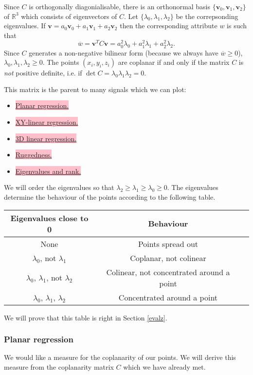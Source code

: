 \documentclass[a4paper,11pt,twoside]{article}
\theoremstyle{definition}
\theoremstyle{remark}
\newcommand{\sh}[1]{\colorbox{pink}{#1}}
\begin{document}
Since $C$ is orthogonally diagonialisable, there is an orthonormal basis $\{\mathbf{v}_0,\mathbf{v}_1,\mathbf{v}_2\}$ of $\mathbb{R}^3$ which consists of eigenvectors of $C$. Let $\{\lambda_0,\lambda_1,\lambda_2\}$ be the correpsonding eigenvalues. If $\mathbf{v}=a_0\mathbf{v}_0+a_1\mathbf{v}_1+a_2\mathbf{v}_2$ then the corresponding attribute $w$ is such that 
\begin{displaymath}
\overline w = \mathbf{v}^TC\mathbf{v}= a_0^2\lambda_0+a_1^2\lambda_1+a^2_2\lambda_2.
\end{displaymath}
Since $C$ generates a non-negative bilinear form (because we always have $\overline w\geqslant 0$), $\lambda_0,\lambda_1,\lambda_2\geqslant 0$. The points $(x_i,y_i,z_i)$ are coplanar if and only if the matrix $C$ is \emph{not} positive definite, i.e. if $\det C =\lambda_0\lambda_1\lambda_2 =0$.

This matrix is the parent to many signals which we can plot:
\begin{itemize}
\item \hyperref[lab0]{\sh{Planar regression.}}
\item \hyperref[lab1]{\sh{XY-linear regression.}}
\item \hyperref[lab2]{\sh{3D linear regression.}}
\item \hyperref[lab3]{\sh{Ruggedness.}}
\item \hyperref[evalz]{\sh{Eigenvalues and rank.}}
\end{itemize}
We will order the eigenvalues so that $\lambda_2\geqslant \lambda_1\geqslant\lambda_0\geqslant 0$. The eigenvalues determine the behaviour of the points according to the following table.
\begin{center}
\begin{tabular}{| c|c|c }
 Eigenvalues close to 0 & Behaviour  \\\hline 
  None & Points spread out \\
 $\lambda_0$, not $\lambda_1$& Coplanar, not colinear\\ 
 $\lambda_0$, $\lambda_1$, not $\lambda_2$ & Colinear, not concentrated around a point \\  
 $\lambda_0$, $\lambda_1$, $\lambda_2$ & Concentrated around a point
\end{tabular}
\end{center}
We will prove that this table is right in Section \hyperref[evals]{\ref*{evalz}}.
\newpage
\subsubsection{Planar regression}\label{lab0}
We would like a measure for the coplanarity of our points. We will derive this measure from the coplanarity matrix $C$ which we have already met.
\end{document}
